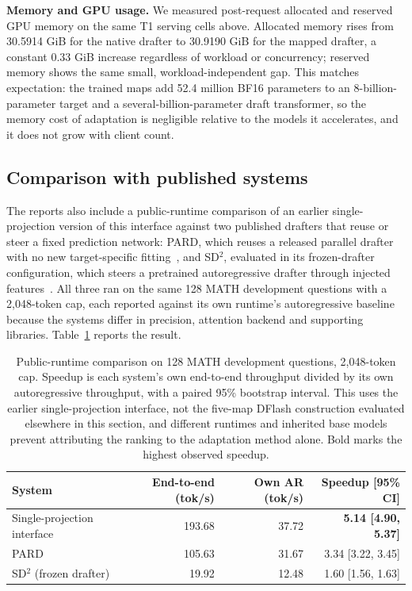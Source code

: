\textbf{Memory and GPU usage.} We measured post-request allocated and reserved GPU memory on the same T1 serving cells above. Allocated memory rises from 30.5914 GiB for the native drafter to 30.9190 GiB for the mapped drafter, a constant 0.33 GiB increase regardless of workload or concurrency; reserved memory shows the same small, workload-independent gap. This matches expectation: the trained maps add 52.4 million BF16 parameters to an 8-billion-parameter target and a several-billion-parameter draft transformer, so the memory cost of adaptation is negligible relative to the models it accelerates, and it does not grow with client count.

\subsection{Comparison with published systems}
\label{sec:related-work-compare}
The reports also include a public-runtime comparison of an earlier single-projection version of this interface against two published drafters that reuse or steer a fixed prediction network: PARD, which reuses a released parallel drafter with no new target-specific fitting~\citep{an2026pard}, and SD$^2$, evaluated in its frozen-drafter configuration, which steers a pretrained autoregressive drafter through injected features~\citep{berdoz2026steering}. All three ran on the same 128 MATH development questions with a 2{,}048-token cap, each reported against its own runtime's autoregressive baseline because the systems differ in precision, attention backend and supporting libraries. Table~\ref{tab:public-runtime} reports the result.

\begin{table}[t]
\centering
\caption{Public-runtime comparison on 128 MATH development questions, 2{,}048-token cap. Speedup is each system's own end-to-end throughput divided by its own autoregressive throughput, with a paired 95\% bootstrap interval. This uses the earlier single-projection interface, not the five-map DFlash construction evaluated elsewhere in this section, and different runtimes and inherited base models prevent attributing the ranking to the adaptation method alone. Bold marks the highest observed speedup.}
\label{tab:public-runtime}
\small
\begin{tabular}{lrrr}
\toprule
System & End-to-end (tok/s) & Own AR (tok/s) & Speedup [95\% CI] \\
\midrule
Single-projection interface & 193.68 & 37.72 & \textbf{5.14 [4.90, 5.37]} \\
PARD & 105.63 & 31.67 & 3.34 [3.22, 3.45] \\
SD$^2$ (frozen drafter) & 19.92 & 12.48 & 1.60 [1.56, 1.63] \\
\bottomrule
\end{tabular}
\end{table}


